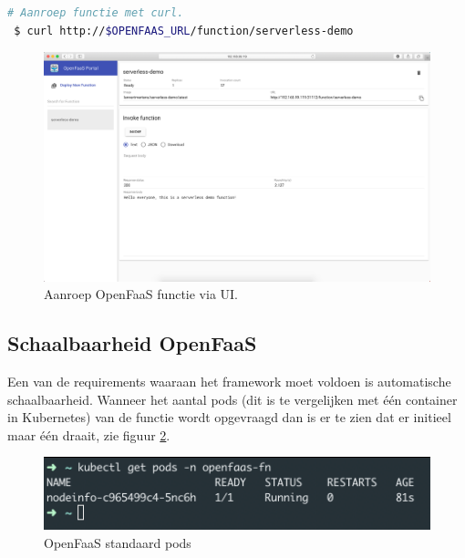 \begin{lstlisting}[language=bash]
# Aanroep functie met curl.
 $ curl http://$OPENFAAS_URL/function/serverless-demo
\end{lstlisting}

\begin{figure}
    \includegraphics[width=1\textwidth]{img/openfaas-demo-ui.png}
    \caption{Aanroep OpenFaaS functie via UI.}
    \label{fig:openfaas-functie-ui}  
\end{figure}

\subsection{Schaalbaarheid OpenFaaS}
Een van de requirements waaraan het framework moet voldoen is automatische schaalbaarheid. Wanneer het aantal pods (dit is te vergelijken met één container in Kubernetes) van de functie wordt opgevraagd dan is er te zien dat er initieel maar één draait, zie figuur \ref{fig:openfaas-scalability-1}.
\begin{figure}
    \includegraphics[width=1\textwidth]{img/openfaas-scalability-1.png}
    \caption{OpenFaaS standaard pods}
    \label{fig:openfaas-scalability-1}  
\end{figure}

